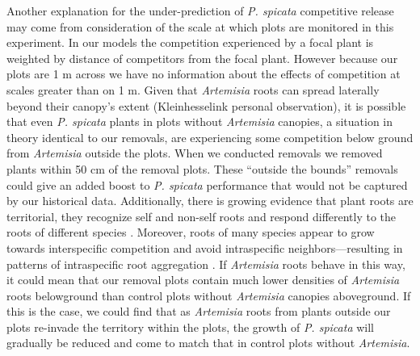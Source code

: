 \documentclass[11pt]{article}
\begin{document}
\begin{doublespacing}

Another explanation for the under-prediction of \textit{P. spicata} competitive release may come from consideration of the scale at which plots are monitored in this experiment. In our models the competition experienced by a focal plant is weighted by distance of competitors from the focal plant. However because our plots are 1 m across we have no information about the effects of competition at scales greater than on 1 m.  Given that \textit{Artemisia} roots can spread laterally beyond their canopy’s extent (Kleinhesselink personal observation), it is possible that even \textit{P. spicata} plants in plots without \textit{Artemisia} canopies, a situation in theory identical to our removals, are experiencing some competition below ground from \textit{Artemisia} outside the plots. When we conducted removals we removed plants within 50 cm of the removal plots. These “outside the bounds” removals could give an added boost to \textit{P. spicata} performance that would not be captured by our historical data.  Additionally, there is growing evidence that plant roots are territorial, they recognize self and non-self roots and respond differently to the roots of different species \citep{Krinnetz and Caldwell}. Moreover, roots of many species appear to grow towards interspecific competition and avoid intraspecific neighbors—resulting in patterns of intraspecific root aggregation \citep{bertelheimer_aggregative_2006}.  If \textit{Artemisia} roots behave in this way, it could mean that our removal plots contain much lower densities of \textit{Artemisia} roots belowground than control plots without \textit{Artemisia} canopies aboveground. If this is the case, we could find that as \textit{Artemisia} roots from plants outside our plots re-invade the territory within the plots, the growth of \textit{P. spicata} will gradually be reduced and come to match that in control plots without \textit{Artemisia}.  


\end{doublespacing}
\end{document}
